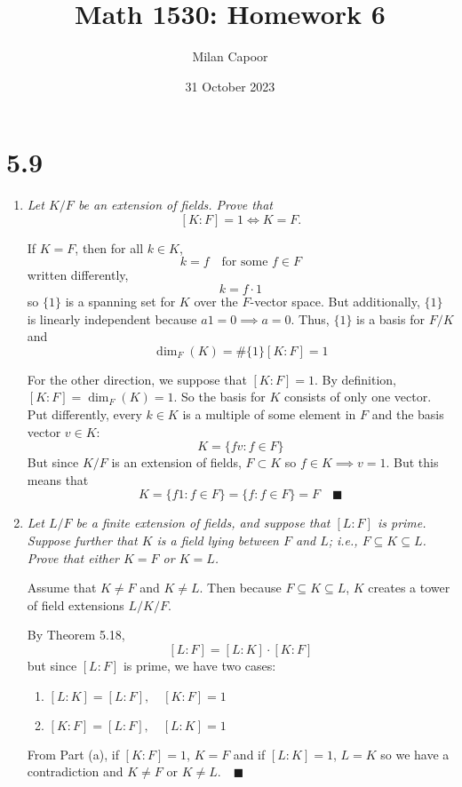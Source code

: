 \documentclass[12pt]{article}
\title{Math 1530: Homework 6}
\author{Milan Capoor}
\date{31 October 2023}
\newcommand{\qed}{\quad \blacksquare}
\begin{document}
\maketitle
\section*{5.9}
    \begin{enumerate}[label=(\alph*)]
        \item \emph{Let $K / F$ be an extension of fields. Prove that}
        \[[K : F] = 1 \iff K = F.\]

            \color{blue}    
                If $K = F$, then for all $k \in K$,
                \[k = f \quad \text{for some } f \in F\]
                written differently, 
                \[k= f\cdot 1\]
                so $\{1\}$ is a spanning set for $K$ over the $F$-vector space. But additionally, $\{1\}$ is linearly independent because $a1 = 0 \implies a = 0$. Thus, $\{1\}$ is a basis for $F/K$ and 
                \[\dim_F(K) = \#\{1\} [K : F] = 1\]

                For the other direction, we suppose that $[K : F] = 1$. 
                By definition, $[K : F] = \dim_F(K) = 1$. So the basis for $K$ consists of only one vector. Put differently, every $k \in K$ is a multiple of some element in $F$ and the basis vector $v \in K$:
                \[K = \{fv : f\in F\}\]
                But since $K / F$ is an extension of fields, $F \subset K$ so $f \in K \implies v = 1$. But this means that 
                \[K = \{f1 : f\in F\} = \{f: f \in F\} = F \qed\]
            \color{black}

        \item \emph{Let $L/ F$ be a finite extension of fields, and suppose that $[L : F]$ is prime. Suppose further that $K$ is a field lying between $F$ and $L$; i.e., $F \subseteq K \subseteq L$. Prove that either $K = F$ or $K=L$. }
        
            \color{blue}
                Assume that $K \neq F$ and $K \neq L$. Then because $F \subseteq K \subseteq L$, $K$ creates a tower of field extensions $L/K/F$. 

                By Theorem 5.18,
                \[[L : F] = [L : K] \cdot [K : F]\]
                but since $[L:F]$ is prime, we have two cases:
                \begin{enumerate}
                    \item $[L:K] = [L:F], \quad [K:F] = 1$
                    \item $[K:F] = [L:F], \quad [L:K] = 1$
                \end{enumerate}

                From Part (a), if $[K:F] = 1$, $K = F$ and if $[L:K] = 1$, $L = K$ so we have a contradiction and $K \neq F$ or $K \neq L. \qed$
            \color{black}
    \end{enumerate}
\pagebreak
\end{document}
